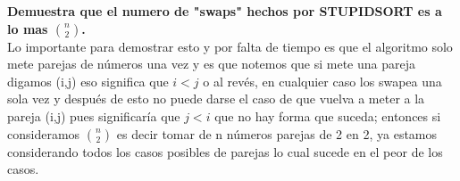 \textbf{Demuestra que el numero de "swaps" hechos por STUPIDSORT es a lo mas $\binom{n}{2}$.}\\

Lo importante para demostrar esto y por falta de tiempo es que el algoritmo solo mete parejas de números una vez y es que notemos que si mete una pareja digamos (i,j) eso significa que $i<j$ o al revés, en cualquier caso los swapea una sola vez y después de esto no puede darse el caso de que vuelva a meter a la pareja (i,j) pues significaría que $j<i$ que no hay forma que suceda; entonces si consideramos $\binom{n}{2}$ es decir tomar de n números parejas de 2 en 2, ya estamos considerando todos los casos posibles de parejas lo cual sucede en el peor de los casos.\\

